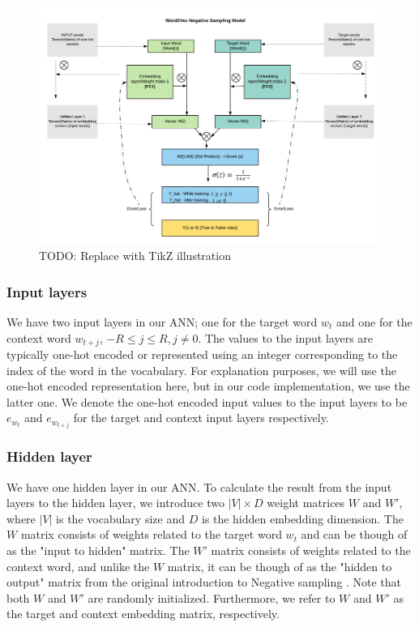 \begin{figure}[ht]
    \centering
    \includegraphics[width=15cm]{thesis/figures/word2vec-skip-gram-negative-sampling.png}
    \caption{TODO: Replace with TikZ illustration}
    \label{fig:word2vec-skip-gram-negative-sampling}
\end{figure}

\subsubsection{Input layers}
We have two input layers in our ANN; one for the target word $w_t$ and one for the context word $w_{t+j}$, $-R \leq j \leq R, j \neq 0$. The values to the input layers are typically one-hot encoded or represented using an integer corresponding to the index of the word in the vocabulary. For explanation purposes, we will use the one-hot encoded representation here, but in our code implementation, we use the latter one. We denote the one-hot encoded input values to the input layers to be $e_{w_t}$ and $e_{w_{t+j}}$ for the target and context input layers respectively.

\subsubsection{Hidden layer}
We have one hidden layer in our ANN. To calculate the result from the input layers to the hidden layer, we introduce two $|V| \times D$ weight matrices $W$ and $W'$, where $|V|$ is the vocabulary size and $D$ is the hidden embedding dimension. The $W$ matrix consists of weights related to the target word $w_t$ and can be though of as the "input to hidden" matrix. The $W'$ matrix consists of weights related to the context word, and unlike the $W$ matrix, it can be though of as the "hidden to output" matrix from the original introduction to Negative sampling \cite{mikolov2013b}. Note that both $W$ and $W'$ are randomly initialized. Furthermore, we refer to $W$ and $W'$ as the target and context embedding matrix, respectively.


